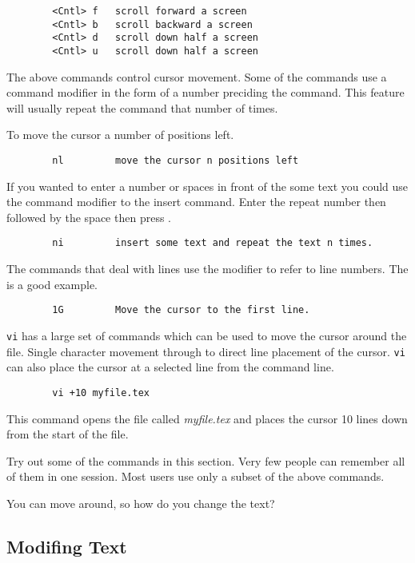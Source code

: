 \begin{verbatim}
        <Cntl> f   scroll forward a screen
        <Cntl> b   scroll backward a screen
        <Cntl> d   scroll down half a screen
        <Cntl> u   scroll down half a screen
\end{verbatim}

        The above commands control cursor movement. Some of the commands
use a command modifier in the form of a number preciding the command. This
feature will usually repeat the command that number of times.

To move the cursor a number of positions left.
\begin{verbatim}
        nl         move the cursor n positions left
\end{verbatim}

If you wanted to enter a number or spaces in front of the some text you could
use the command modifier to the insert command. Enter the repeat number then
 followed by the space then press .
\begin{verbatim}
        ni         insert some text and repeat the text n times.
\end{verbatim}

The commands that deal with lines use the modifier to refer to line numbers.
The  is a good example.

\begin{verbatim}
        1G         Move the cursor to the first line.
\end{verbatim}

{\tt vi} has a large set of commands which can be used to move the cursor
around the file. Single character movement through to direct line placement
of the cursor. {\tt vi} can also place the cursor at a selected line from the
command line.
\begin{verbatim}
        vi +10 myfile.tex
\end{verbatim}
This command opens the file called {\em myfile.tex} and places the cursor
10 lines down from the start of the file.

Try out some of the commands in this section. Very few people
can remember all of them in one session. Most users use only a subset of the
above commands. 

You can move around, so how do you change the text?

\subsection{Modifing Text}

